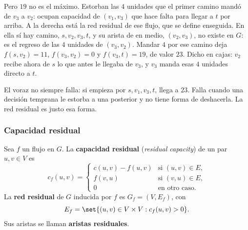 \documentclass[11pt,letterpaper]{article}
\begin{document}
\begin{ejemplo}
\begin{center}
  \end{center}
  Pero $19$ no es el máximo. Estorban las $4$ unidades que el primer
  camino mandó de $v_3$ a $v_2$: ocupan capacidad de $(v_1, v_3)$ que
  hace falta para llegar a $t$ por arriba. A la derecha está la red
  residual de ese flujo, que se define enseguida. En ella sí hay
  camino, $s, v_2, v_3, t$, y su arista de en medio, $(v_2, v_3)$, no
  existe en $G$: es el regreso de las $4$ unidades de $(v_3, v_2)$.
  Mandar $4$ por ese camino deja $f(s, v_2) = 11$, $f(v_3, v_2) = 0$ y
  $f(v_3, t) = 19$, de valor $23$. Dicho en cajas: $v_2$ recibe ahora
  de $s$ lo que antes le llegaba de $v_3$, y $v_3$ manda esas $4$
  unidades directo a $t$.
\end{ejemplo}

El voraz no siempre falla: si empieza por $s, v_1, v_3, t$, llega a
$23$. Falla cuando una decisión temprana le estorba a una posterior y
no tiene forma de deshacerla. La red residual es justo esa forma.

\subsubsection*{Capacidad residual}

\begin{definicion}\label{def:red-residual}
  Sea $f$ un flujo en $G$. La \textbf{capacidad residual}
  (\textit{residual capacity}) de un par $u, v \in V$ es
  \[
    c_f(u, v) =
    \begin{cases}
      c(u, v) - f(u, v) & \text{si } (u, v) \in E , \\
      f(v, u)           & \text{si } (v, u) \in E , \\
      0                 & \text{en otro caso.}
    \end{cases}
  \]
  La \textbf{red residual} de $G$ inducida por $f$ es
  $G_f = (V, E_f)$, con
  \[
    E_f = \set{(u, v) \in V \times V : c_f(u, v) > 0} .
  \]
  Sus aristas se llaman \textbf{aristas residuales}.
\end{definicion}
\end{document}

